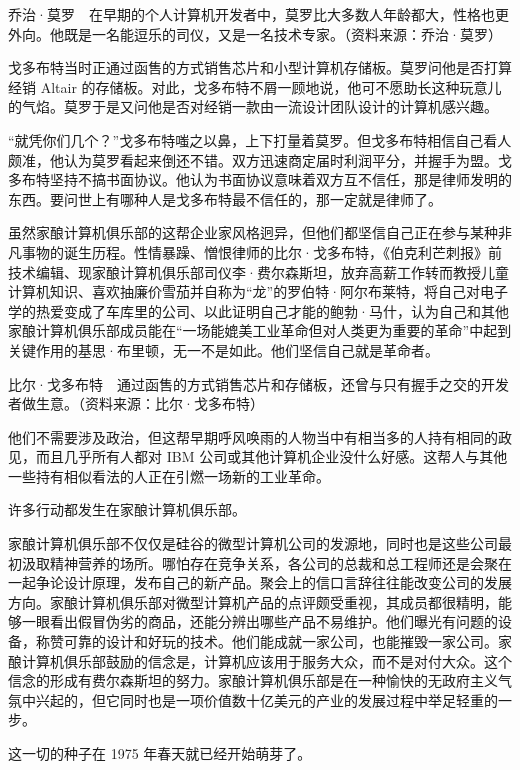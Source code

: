 \documentclass[12pt,UTF8]{ctexbook}
\begin{document}
乔治·莫罗　在早期的个人计算机开发者中，莫罗比大多数人年龄都大，性格也更外向。他既是一名能逗乐的司仪，又是一名技术专家。（资料来源：乔治·莫罗）

戈多布特当时正通过函售的方式销售芯片和小型计算机存储板。莫罗问他是否打算经销 Altair 的存储板。对此，戈多布特不屑一顾地说，他可不愿助长这种玩意儿的气焰。莫罗于是又问他是否对经销一款由一流设计团队设计的计算机感兴趣。

“就凭你们几个？”戈多布特嗤之以鼻，上下打量着莫罗。但戈多布特相信自己看人颇准，他认为莫罗看起来倒还不错。双方迅速商定届时利润平分，并握手为盟。戈多布特坚持不搞书面协议。他认为书面协议意味着双方互不信任，那是律师发明的东西。要问世上有哪种人是戈多布特最不信任的，那一定就是律师了。

虽然家酿计算机俱乐部的这帮企业家风格迥异，但他们都坚信自己正在参与某种非凡事物的诞生历程。性情暴躁、憎恨律师的比尔·戈多布特，《伯克利芒刺报》前技术编辑、现家酿计算机俱乐部司仪李·费尔森斯坦，放弃高薪工作转而教授儿童计算机知识、喜欢抽廉价雪茄并自称为“龙”的罗伯特·阿尔布莱特，将自己对电子学的热爱变成了车库里的公司、以此证明自己才能的鲍勃·马什，认为自己和其他家酿计算机俱乐部成员能在“一场能媲美工业革命但对人类更为重要的革命”中起到关键作用的基思·布里顿，无一不是如此。他们坚信自己就是革命者。



比尔·戈多布特　通过函售的方式销售芯片和存储板，还曾与只有握手之交的开发者做生意。（资料来源：比尔·戈多布特）

他们不需要涉及政治，但这帮早期呼风唤雨的人物当中有相当多的人持有相同的政见，而且几乎所有人都对 IBM 公司或其他计算机企业没什么好感。这帮人与其他一些持有相似看法的人正在引燃一场新的工业革命。

许多行动都发生在家酿计算机俱乐部。

家酿计算机俱乐部不仅仅是硅谷的微型计算机公司的发源地，同时也是这些公司最初汲取精神营养的场所。哪怕存在竞争关系，各公司的总裁和总工程师还是会聚在一起争论设计原理，发布自己的新产品。聚会上的信口言辞往往能改变公司的发展方向。家酿计算机俱乐部对微型计算机产品的点评颇受重视，其成员都很精明，能够一眼看出假冒伪劣的商品，还能分辨出哪些产品不易维护。他们曝光有问题的设备，称赞可靠的设计和好玩的技术。他们能成就一家公司，也能摧毁一家公司。家酿计算机俱乐部鼓励的信念是，计算机应该用于服务大众，而不是对付大众。这个信念的形成有费尔森斯坦的努力。家酿计算机俱乐部是在一种愉快的无政府主义气氛中兴起的，但它同时也是一项价值数十亿美元的产业的发展过程中举足轻重的一步。

这一切的种子在 1975 年春天就已经开始萌芽了。
\end{document}

